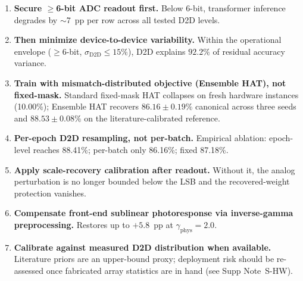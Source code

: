 
\begin{tcolorbox}[colback=blue!5!white,colframe=blue!75!black,title=\textbf{Box~1: Design rules for analog CIM transformer deployment}]
\footnotesize
\begin{enumerate}[leftmargin=1.2em,itemsep=2pt]
    \item \textbf{Secure $\geq$6-bit ADC readout first.}
    Below 6-bit, transformer inference degrades by $\sim$7~pp per row across all tested D2D levels.

    \item \textbf{Then minimize device-to-device variability.}
    Within the operational envelope ($\geq$6-bit, $\sigma_{\mathrm{D2D}} \leq 15\%$), D2D explains $92.2\%$ of residual accuracy variance.

    \item \textbf{Train with mismatch-distributed objective (Ensemble HAT), not fixed-mask.}
    Standard fixed-mask HAT collapses on fresh hardware instances (10.00\%); Ensemble HAT recovers $86.16\pm0.19\%$ canonical across three seeds and $88.53\pm0.08\%$ on the literature-calibrated reference.

    \item \textbf{Per-epoch D2D resampling, not per-batch.}
    Empirical ablation: epoch-level reaches 88.41\%; per-batch only 86.16\%; fixed 87.18\%.

    \item \textbf{Apply scale-recovery calibration after readout.}
    Without it, the analog perturbation is no longer bounded below the LSB and the recovered-weight protection vanishes.

    \item \textbf{Compensate front-end sublinear photoresponse via inverse-gamma preprocessing.}
    Restores up to $+5.8$~pp at $\gamma_{\mathrm{phys}}=2.0$.

    \item \textbf{Calibrate against measured D2D distribution when available.}
    Literature priors are an upper-bound proxy; deployment risk should be re-assessed once fabricated array statistics are in hand (see Supp Note~S-HW).
\end{enumerate}
\end{tcolorbox}
